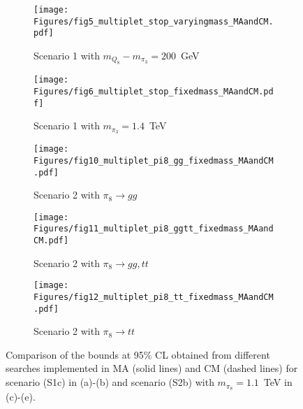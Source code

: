 \documentclass[preprintnumbers,nofootinbib,showpacs,eqsecnum,pre,12pt]{revtex4-1}
\begin{document}
\begin{figure}
	\centering
	\begin{subfigure}[]{0.41\linewidth}
		\centering
		\texttt{[image: Figures/fig5\_multiplet\_stop\_varyingmass\_MAandCM.pdf]} 
		\caption{Scenario 1 with $m_{Q_8}-m_{\pi_3}=200$~GeV} \label{fig:fig5_multiplet_stop_varyingmass_MAandCM}
	\end{subfigure}
	\hspace{2ex}
	\begin{subfigure}[]{0.41\linewidth}
		\centering
		\texttt{[image: Figures/fig6\_multiplet\_stop\_fixedmass\_MAandCM.pdf]} 
		\caption{Scenario 1 with $m_{\pi_3}=1.4$~TeV}
		\label{fig:fig6_multiplet_stop_fixedmass_MAandCM}
	\end{subfigure}
	\vspace{2ex}
	
	\begin{subfigure}[]{0.41\linewidth}
		\centering
		\texttt{[image: Figures/fig10\_multiplet\_pi8\_gg\_fixedmass\_MAandCM.pdf]} 
		\caption{Scenario 2 with $\pi_8\to gg$} \label{fig:fig10_multiplet_pi8_gg_fixedmass_MA_comparison}
	\end{subfigure}
	\hspace{2ex}
	\begin{subfigure}[]{0.41\linewidth}
		\centering
		\texttt{[image: Figures/fig11\_multiplet\_pi8\_ggtt\_fixedmass\_MAandCM.pdf]} 
		\caption{Scenario 2 with $\pi_8\to gg,tt$}
		\label{fig:fig11_multiplet_pi8_ggtt_fixedmass_MA_comparison}
	\end{subfigure}
	\vspace{2ex}
	
	\begin{subfigure}[]{0.41\linewidth}
		\centering
		\texttt{[image: Figures/fig12\_multiplet\_pi8\_tt\_fixedmass\_MAandCM.pdf]} 
		\caption{Scenario 2 with $\pi_8\to tt$} \label{fig:fig12_multiplet_pi8_tt_fixedmass_MA_comparison}
	\end{subfigure}
	\caption{Comparison of the bounds at 95\% CL obtained from different searches \cite{CMS:2019zmd, ATLAS:2019vcq, ATLAS:2017mjy, CMS:2017abv, ATLAS:2021twp, ATLAS:2018yhd, ATLAS:2019gdh} implemented in MA (solid lines) and CM (dashed lines) for scenario (S1c) in (a)-(b) and scenario (S2b) with $m_{\pi_8}=1.1$~TeV in (c)-(e).}
	\label{fig:bounds_allsearches}
\end{figure}
\end{document}
